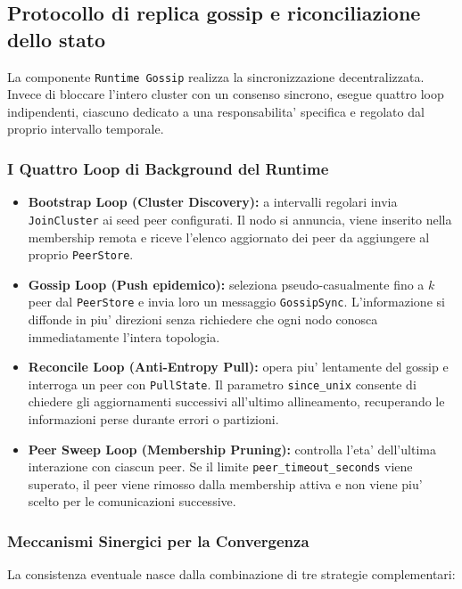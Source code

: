 \documentclass[conference]{IEEEtran}
\begin{document}
\subsection{Protocollo di replica gossip e riconciliazione dello stato}
La componente \texttt{Runtime Gossip} realizza la sincronizzazione decentralizzata. Invece di bloccare l'intero cluster con un consenso sincrono, esegue quattro loop indipendenti, ciascuno dedicato a una responsabilita' specifica e regolato dal proprio intervallo temporale.

\subsubsection{I Quattro Loop di Background del Runtime}

\begin{itemize}[leftmargin=1.2cm]
  \item \textbf{Bootstrap Loop (Cluster Discovery):} a intervalli regolari invia \texttt{JoinCluster} ai seed peer configurati. Il nodo si annuncia, viene inserito nella membership remota e riceve l'elenco aggiornato dei peer da aggiungere al proprio \texttt{PeerStore}.
  
  \item \textbf{Gossip Loop (Push epidemico):} seleziona pseudo-casualmente fino a $k$ peer dal \texttt{PeerStore} e invia loro un messaggio \texttt{GossipSync}. L'informazione si diffonde in piu' direzioni senza richiedere che ogni nodo conosca immediatamente l'intera topologia.
  
  \item \textbf{Reconcile Loop (Anti-Entropy Pull):} opera piu' lentamente del gossip e interroga un peer con \texttt{PullState}. Il parametro \texttt{since\_unix} consente di chiedere gli aggiornamenti successivi all'ultimo allineamento, recuperando le informazioni perse durante errori o partizioni.
  
  \item \textbf{Peer Sweep Loop (Membership Pruning):} controlla l'eta' dell'ultima interazione con ciascun peer. Se il limite \texttt{peer\_timeout\_seconds} viene superato, il peer viene rimosso dalla membership attiva e non viene piu' scelto per le comunicazioni successive.
\end{itemize}

\subsubsection{Meccanismi Sinergici per la Convergenza}
La consistenza eventuale nasce dalla combinazione di tre strategie complementari:
\end{document}
